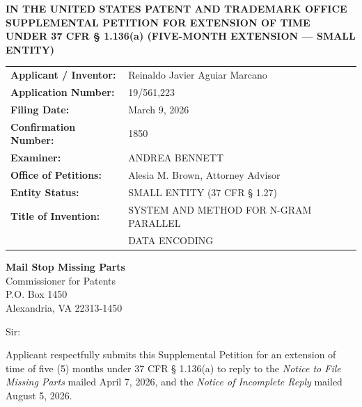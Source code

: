 \documentclass[11pt,letterpaper]{article}
\begin{document}
\thispagestyle{empty}

\begin{center}
    \textbf{\large IN THE UNITED STATES PATENT AND TRADEMARK OFFICE} \\
    \vspace{0.3cm}
    \textbf{\large SUPPLEMENTAL PETITION FOR EXTENSION OF TIME} \\
    \textbf{\normalsize UNDER 37 CFR \S{} 1.136(a) (FIVE-MONTH EXTENSION --- SMALL ENTITY)}
\end{center}

\vspace{0.4cm}
\noindent\begin{tabular}{p{2.3in}p{4.0in}}
\textbf{Applicant / Inventor:} & Reinaldo Javier Aguiar Marcano \\
\textbf{Application Number:} & 19/561,223 \\
\textbf{Filing Date:} & March 9, 2026 \\
\textbf{Confirmation Number:} & 1850 \\
\textbf{Examiner:} & ANDREA BENNETT \\
\textbf{Office of Petitions:} & Alesia M. Brown, Attorney Advisor \\
\textbf{Entity Status:} & SMALL ENTITY (37 CFR \S{} 1.27) \\
\textbf{Title of Invention:} & SYSTEM AND METHOD FOR N-GRAM PARALLEL \\
& DATA ENCODING \\
\end{tabular}

\vspace{0.5cm}
\noindent\textbf{Mail Stop Missing Parts} \\
Commissioner for Patents \\
P.O. Box 1450 \\
Alexandria, VA 22313-1450

\vspace{0.2cm}
Sir:

Applicant respectfully submits this Supplemental Petition for an extension of time of five (5) months under 37 CFR \S{} 1.136(a) to reply to the \textit{Notice to File Missing Parts} mailed April 7, 2026, and the \textit{Notice of Incomplete Reply} mailed August 5, 2026.
\end{document}
